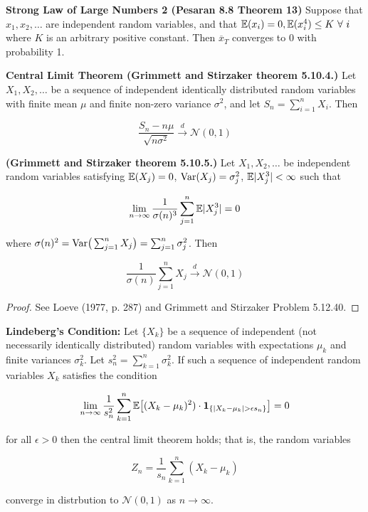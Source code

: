 \begin{theorem}\textbf{Strong Law of Large Numbers 2 (Pesaran 8.8 Theorem 13)} Suppose that \(x_1, x_2, \ldots\) are independent random variables, and that \(\mathbb{E}(x_i) = 0, \mathbb{E}(x_i^4) \leq K \ \forall \ i\) where \(K\) is an arbitrary positive constant. Then \(\overline{x}_T\) converges to 0 with probability 1.
\end{theorem}

\begin{theorem}\textbf{Central Limit Theorem (Grimmett and Stirzaker theorem 5.10.4.)} Let \(X_1, X_2, \ldots\) be a sequence of independent identically distributed random variables with finite mean \(\mu\) and finite non-zero variance \(\sigma^2\), and let \(S_n = \sum_{i=1}^n X_i\). Then

\[
\frac{S_n - n \mu}{\sqrt{n \sigma^2}} \xrightarrow{d} \mathcal{N}(0,1)
\]
\end{theorem}

\begin{theorem}\textbf{(Grimmett and Stirzaker theorem 5.10.5.)} Let \(X_1, X_2, \ldots\) be independent random variables satisfying \(\mathbb{E}(X_j) = 0\), \(\mathrm{Var}(X_j) = \sigma_j^2\), \(\mathbb{E}|X_j^3| < \infty\) such that

\[
\lim_{n \to \infty} \frac{1}{\sigma(n)^3} \sum_{j=1}^n \mathbb{E}|X_j^3| = 0
\]

where \(\sigma(n)^2 = \mathrm{Var}\big( \sum_{j=1}^n X_j \big) = \sum_{j=1}^n \sigma_j^2\). Then 

\[
\frac{1}{\sigma(n)} \sum_{j=1}^n X_j \xrightarrow{d} \mathcal{N}(0,1)
\]
\end{theorem}
\begin{proof}See Loeve (1977, p. 287) and Grimmett and Stirzaker Problem 5.12.40.\end{proof}

\begin{lemma}\textbf{Lindeberg's Condition:} Let \(\{X_k\}\) be a sequence of independent (not necessarily identically distributed) random variables with expectations \(\mu_k\) and finite variances \(\sigma_k^2\). Let \(s_n^2 = \sum_{k=1}^n \sigma_k^2\). If such a sequence of independent random variables \(X_k\) satisfies the condition

\[
\lim_{n \to \infty} \frac{1}{s_n^2} \sum_{k=1}^n \mathbb{E} \big[(X_k - \mu_k)^2) \cdot \boldsymbol{1}_{\{|X_k - \mu_k| > \epsilon s_n\}} \big] = 0
\]

for all \(\epsilon > 0\) then the central limit theorem holds; that is, the random variables

\[
Z_n = \frac{1}{s_n} \sum_{k=1}^n(X_k - \mu_k)
\]

converge in distrbution to \(\mathcal{N}(0, 1)\) as \(n \to \infty\).
\end{lemma}

